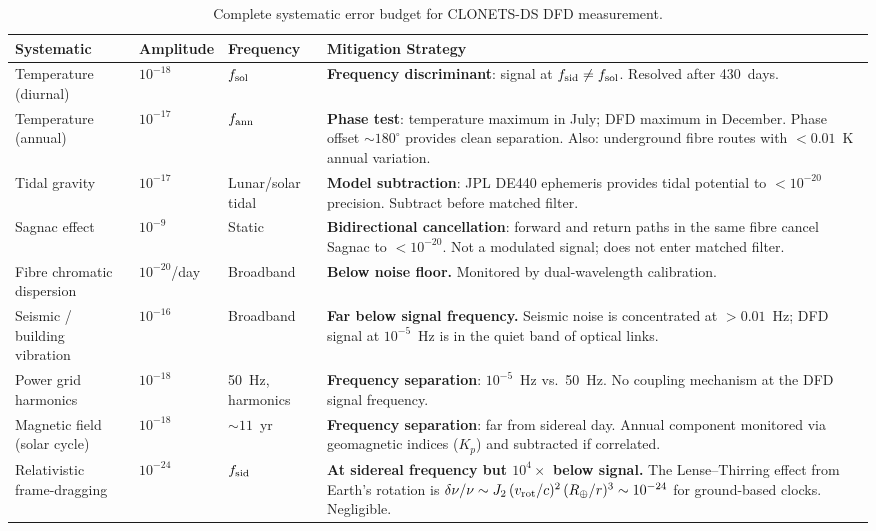 \documentclass[11pt]{article}
\begin{document}
\begin{table}[H]
\centering
\caption{Complete systematic error budget for CLONETS-DS DFD measurement.}
\label{tab:syst-complete}
\begin{tabular}{p{3cm}p{2cm}p{2cm}p{5cm}}
\toprule
\textbf{Systematic} & \textbf{Amplitude} & \textbf{Frequency} & \textbf{Mitigation Strategy} \\
\midrule
Temperature (diurnal) & $10^{-18}$ & $f_{\rm sol}$ &
  \textbf{Frequency discriminant}: signal at $f_{\rm sid} \neq f_{\rm sol}$.
  Resolved after 430~days. \\[4pt]
Temperature (annual) & $10^{-17}$ & $f_{\rm ann}$ &
  \textbf{Phase test}: temperature maximum in July; DFD maximum in
  December. Phase offset $\sim 180^\circ$ provides clean separation.
  Also: underground fibre routes with $< 0.01$~K annual variation. \\[4pt]
Tidal gravity & $10^{-17}$ & Lunar/solar tidal &
  \textbf{Model subtraction}: JPL DE440 ephemeris provides tidal
  potential to $< 10^{-20}$ precision. Subtract before matched filter. \\[4pt]
Sagnac effect & $10^{-9}$ & Static &
  \textbf{Bidirectional cancellation}: forward and return paths in
  the same fibre cancel Sagnac to $< 10^{-20}$. Not a modulated
  signal; does not enter matched filter. \\[4pt]
Fibre chromatic dispersion & $10^{-20}$/day & Broadband &
  \textbf{Below noise floor.} Monitored by dual-wavelength calibration. \\[4pt]
Seismic / building vibration & $10^{-16}$ & Broadband &
  \textbf{Far below signal frequency.} Seismic noise is concentrated
  at $> 0.01$~Hz; DFD signal at $10^{-5}$~Hz is in the quiet band
  of optical links. \\[4pt]
Power grid harmonics & $10^{-18}$ & 50~Hz, harmonics &
  \textbf{Frequency separation}: $10^{-5}$~Hz vs.\ 50~Hz. No coupling
  mechanism at the DFD signal frequency. \\[4pt]
Magnetic field (solar cycle) & $10^{-18}$ & $\sim 11$~yr &
  \textbf{Frequency separation}: far from sidereal day. Annual
  component monitored via geomagnetic indices ($K_p$) and subtracted
  if correlated. \\[4pt]
Relativistic frame-dragging & $10^{-24}$ & $f_{\rm sid}$ &
  \textbf{At sidereal frequency but $10^4\times$ below signal.}
  The Lense--Thirring effect from Earth's rotation is
  $\delta\nu/\nu \sim J_2\,(v_{\rm rot}/c)^2\,(R_\oplus/r)^3
  \sim 10^{-24}$ for ground-based clocks. Negligible. \\
\bottomrule
\end{tabular}
\end{table}
\end{document}

